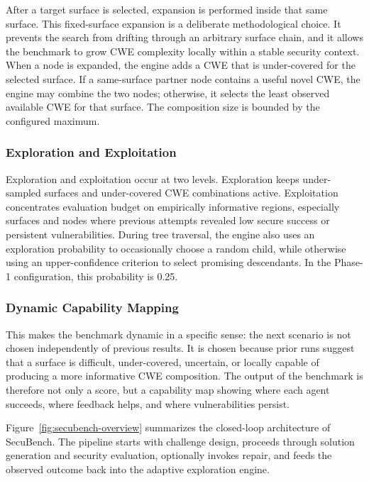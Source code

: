 \documentclass[11pt]{article}
\newcommand{\toolname}{SecuBench}
\begin{document}
After a target surface is selected, expansion is performed inside that same surface. This fixed-surface expansion is a deliberate methodological choice. It prevents the search from drifting through an arbitrary surface chain, and it allows the benchmark to grow CWE complexity locally within a stable security context. When a node is expanded, the engine adds a CWE that is under-covered for the selected surface. If a same-surface partner node contains a useful novel CWE, the engine may combine the two nodes; otherwise, it selects the least observed available CWE for that surface. The composition size is bounded by the configured maximum.

\subsubsection{Exploration and Exploitation}

Exploration and exploitation occur at two levels. Exploration keeps under-sampled surfaces and under-covered CWE combinations active. Exploitation concentrates evaluation budget on empirically informative regions, especially surfaces and nodes where previous attempts revealed low secure success or persistent vulnerabilities. During tree traversal, the engine also uses an exploration probability to occasionally choose a random child, while otherwise using an upper-confidence criterion to select promising descendants. In the Phase-1 configuration, this probability is 0.25.

\subsubsection{Dynamic Capability Mapping}

This makes the benchmark dynamic in a specific sense: the next scenario is not chosen independently of previous results. It is chosen because prior runs suggest that a surface is difficult, under-covered, uncertain, or locally capable of producing a more informative CWE composition. The output of the benchmark is therefore not only a score, but a capability map showing where each agent succeeds, where feedback helps, and where vulnerabilities persist.

Figure~\ref{fig:secubench-overview} summarizes the closed-loop architecture of \toolname{}. The pipeline starts with challenge design, proceeds through solution generation and security evaluation, optionally invokes repair, and feeds the observed outcome back into the adaptive exploration engine.
\end{document}
